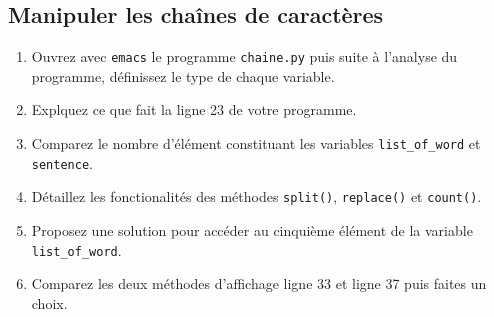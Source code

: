 \subsection{Manipuler les chaînes de caractères}


\begin{enumerate}

\item Ouvrez avec  \texttt{emacs} le  programme \texttt{chaine.py} puis
  suite à l'analyse du programme, définissez le type de chaque variable.

\item Explquez ce que fait la ligne 23 de votre programme.
  
\item Comparez le nombre d'élément constituant les variables \texttt{list\_of\_word} et  \texttt{sentence}.

\item Détaillez les fonctionalités des méthodes \texttt{split()}, \texttt{replace()} et \texttt{count()}.
  
\item Proposez une solution pour accéder au cinquième élément de la variable \texttt{list\_of\_word}.

\item Comparez les deux méthodes d'affichage ligne 33 et ligne 37 puis faites un choix.


\end{enumerate}
